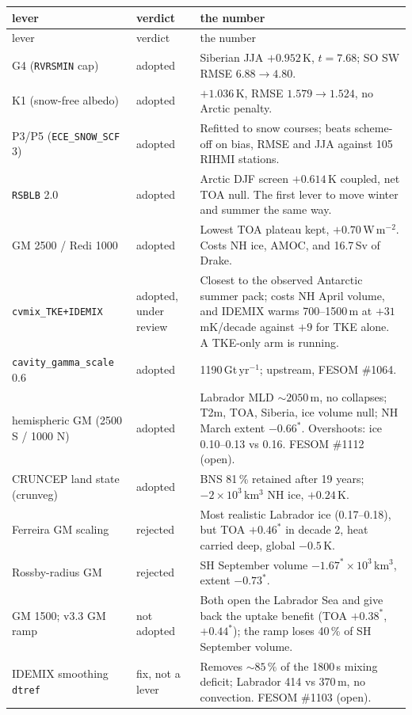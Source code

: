 \documentclass[10pt]{article}
\begin{document}
{\small
\begin{longtable}{p{3.4cm}p{1.5cm}p{10.9cm}}
\toprule
lever & verdict & the number \\
\midrule
\endfirsthead
\toprule
lever & verdict & the number \\
\midrule
\endhead
G4 (\texttt{RVRSMIN} cap) & adopted & Siberian JJA $+0.952$\,K, $t=7.68$; SO SW RMSE
$6.88\to4.80$. \\
K1 (snow-free albedo) & adopted & $+1.036$\,K, RMSE $1.579\to1.524$, no Arctic penalty. \\
P3/P5 (\texttt{ECE\_SNOW\_SCF} 3) & adopted & Refitted to snow courses; beats scheme-off on
bias, RMSE and JJA against 105 RIHMI stations. \\
\texttt{RSBLB} 2.0 & adopted & Arctic DJF screen $+0.614$\,K coupled, net TOA null. The
first lever to move winter and summer the same way. \\
GM 2500 / Redi 1000 & adopted & Lowest TOA plateau kept, $+0.70$\,W\,m$^{-2}$. Costs NH ice,
AMOC, and 16.7\,Sv of Drake. \\
\texttt{cvmix\_TKE+IDEMIX} & adopted, under review & Closest to the observed Antarctic summer pack;
costs NH April volume, and IDEMIX warms 700--1500\,m at $+31$\,mK/decade against $+9$ for TKE alone.
A TKE-only arm is running. \\
\texttt{cavity\_gamma\_scale} 0.6 & adopted & 1190\,Gt\,yr$^{-1}$; upstream, FESOM \#1064. \\
hemispheric GM (2500 S / 1000 N) & adopted & Labrador MLD ${\sim}2050$\,m, no collapses; T2m,
TOA, Siberia, ice volume null; NH March extent $-0.66^*$. Overshoots: ice 0.10--0.13 vs 0.16.
FESOM \#1112 (open). \\
CRUNCEP land state (crunveg) & adopted & BNS 81\,\% retained after 19 years; $-2\times10^3$\,km$^3$
NH ice, $+0.24$\,K. \\
\midrule
Ferreira GM scaling & rejected & Most realistic Labrador ice (0.17--0.18), but TOA $+0.46^*$ in
decade 2, heat carried deep, global $-0.5$\,K. \\
Rossby-radius GM & rejected & SH September volume $-1.67^*\times10^3$\,km$^3$, extent $-0.73^*$. \\
GM 1500; v3.3 GM ramp & not adopted & Both open the Labrador Sea and give back the uptake benefit
(TOA $+0.38^*$, $+0.44^*$); the ramp loses 40\,\% of SH September volume. \\
IDEMIX smoothing \texttt{dtref} & fix, not a lever & Removes ${\sim}85\,\%$ of the
1800\,s mixing deficit; Labrador 414 vs 370\,m, no convection. FESOM \#1103 (open). \\

\end{longtable}}
\end{document}
